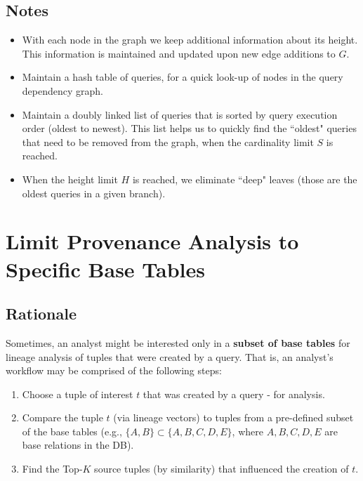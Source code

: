 \subsection{Notes} 
\begin{itemize}
    \item With each node in the graph we keep additional information about its height. This information is maintained and updated upon new edge additions to $G$.
    \item Maintain a hash table of queries, for a quick look-up of nodes in the query dependency graph.
    \item Maintain a doubly linked list of queries that is sorted by query execution order (oldest to newest). This list helps us to quickly find the ``oldest" queries that need to be removed from the graph, when the cardinality limit $S$ is reached.
    \item When the height limit $H$ is reached, we eliminate ``deep" leaves (those are the oldest queries in a given branch).
\end{itemize}


\section{Limit Provenance Analysis to Specific Base Tables}

\subsection{Rationale}
Sometimes, an analyst might be interested only in a \textbf{subset of base tables} for lineage analysis of tuples that were created by a query. That is, an analyst's workflow may be comprised of the following steps:
\begin{enumerate}
    \item Choose a tuple of interest $t$ that was created by a query - for analysis.
    \item Compare the tuple $t$ (via lineage vectors) to tuples from a pre-defined subset of the base tables (e.g., $\{{A, B}\} \subset \{{A,B,C,D,E}\}$, where $A,B,C,D,E$ are base relations in the DB).
    \item Find the Top-$K$ source tuples (by similarity) that influenced the creation of $t$. 
\end{enumerate}

